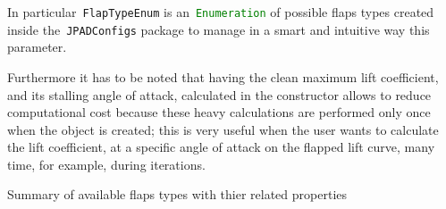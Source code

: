 \noindent
In particular~\lstinline[language=Java]!FlapTypeEnum! is an~\lstinline[language=Java]!Enumeration!\cite{enumAPI} of possible flaps types created inside the~\lstinline[language=Java]!JPADConfigs! package to manage in a smart and intuitive way this parameter. 

Furthermore it has to be noted that having the clean maximum lift coefficient, and its stalling angle of attack, calculated in the constructor allows to reduce computational cost because these heavy calculations are performed only once when the object is created; this is very useful when the user wants to calculate the lift coefficient, at a specific angle of attack on the flapped lift curve, many time, for example, during iterations.  

\begin{table}[!t]
\caption{Summary of available flaps types with thier related properties}
\label{table:AvailableFlaps}
\end{table}

